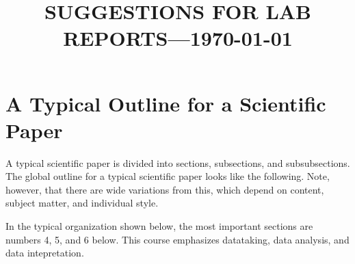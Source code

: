 \documentclass[12pt,preprint]{aastex}
\begin{document}
\title{SUGGESTIONS FOR LAB REPORTS---\today}

\tableofcontents

\section{A Typical Outline for a Scientific Paper}

A typical scientific paper is divided into sections, subsections, and
subsubsections. The global outline for a typical scientific paper looks
like the following. Note, however, that there are wide variations from
this, which depend on content, subject matter, and individual
style. 

In the typical organization shown below, the most important sections are
numbers 4, 5, and 6 below. This course emphasizes datataking, data
analysis, and data intepretation. 
\end{document}
